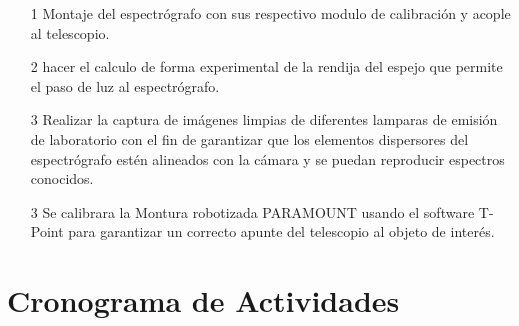 \documentclass[11pt]{article}
\begin{document}
\begin{itemize}

\item[1] Montaje del espectrógrafo con sus respectivo modulo de calibración y acople al telescopio.

\item[2] hacer el calculo de forma experimental de la rendija del espejo que permite el paso de luz al espectrógrafo.

\item[3] Realizar la captura de imágenes limpias de diferentes lamparas de emisión de laboratorio con el fin de garantizar que los elementos dispersores del espectrógrafo estén alineados con la cámara y se puedan reproducir espectros conocidos.

\item[3] Se calibrara la Montura robotizada PARAMOUNT  usando el software T-Point para garantizar un correcto apunte del telescopio al objeto de interés.



 
\end{itemize}



\section{Cronograma de Actividades}	
\end{document}
